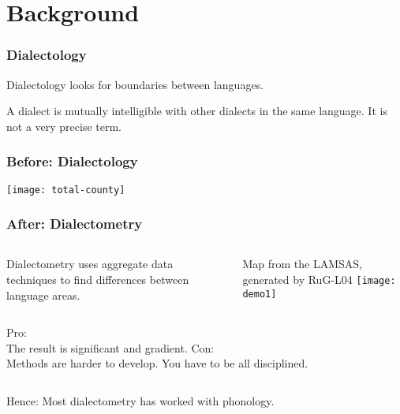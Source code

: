 \documentclass{beamer}
\begin{document}
\section{Background}
\begin{frame}
  \frametitle{Dialectology}
  \begin{definition}
    Dialectology looks for boundaries between languages.
  \end{definition}
  \begin{definition}
    A dialect is mutually intelligible with other dialects in the same
    language. It is not a very precise term.
  \end{definition}

\end{frame}
\begin{frame}
  \frametitle{Before: Dialectology}
  \texttt{[image: total-county]}
\end{frame}
\begin{frame}
  \frametitle{After: Dialectometry}
\begin{columns}

  \begin{definition}
    Dialectometry uses aggregate data techniques to find differences
    between language areas.
  \end{definition}
  Map from the LAMSAS, generated by RuG-L04
  \texttt{[image: demo1]}
\end{columns}
\end{frame}
\begin{frame}
\begin{columns}
Pro:\\
  The result is significant and gradient.
Con: \\
  Methods are harder to develop. You have to be all disciplined.
\end{columns}
\vspace{2cm}
Hence: Most dialectometry has worked with phonology.
\end{frame}
\end{document}
